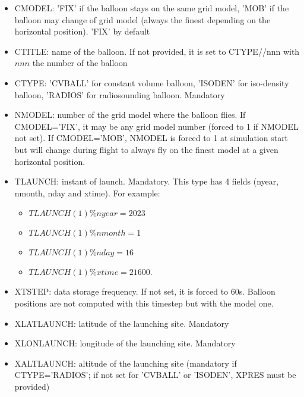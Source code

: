 \begin{itemize}
\item CMODEL: 'FIX' if the balloon stays on the same grid model, 'MOB' if the balloon may change of grid model (always the finest depending on the horizontal position). 'FIX' by default

\item CTITLE: name of the balloon. If not provided, it is set to CTYPE//nnn with $nnn$ the number of the balloon

\item CTYPE: 'CVBALL' for constant volume balloon, 'ISODEN' for iso-density balloon, 'RADIOS' for radiosounding balloon. Mandatory

\item NMODEL: number of the grid model where the balloon flies. If CMODEL='FIX', it may be any grid model number (forced to 1 if NMODEL not set). If CMODEL='MOB', NMODEL is forced to 1 at simulation start but will change during flight to always fly on the finest model at a given horizontal position.

\item TLAUNCH: instant of launch. Mandatory. This type has 4 fields (nyear, nmonth, nday and xtime). For example:
  \begin{itemize}
    \item $TLAUNCH(1)\%nyear  =  2023$
    \item $TLAUNCH(1)\%nmonth =     1$
    \item $TLAUNCH(1)\%nday   =    16$
    \item $TLAUNCH(1)\%xtime  = 21600.$
  \end{itemize}

\item XTSTEP: data storage frequency. If not set, it is forced to 60s. Balloon positions are not computed with this timestep but with the model one.

\item XLATLAUNCH: latitude of the launching site. Mandatory

\item XLONLAUNCH: longitude of the launching site. Mandatory

\item XALTLAUNCH: altitude of the launching site (mandatory if CTYPE='RADIOS'; if not set for 'CVBALL' or 'ISODEN', XPRES must be provided)


\end{itemize}
